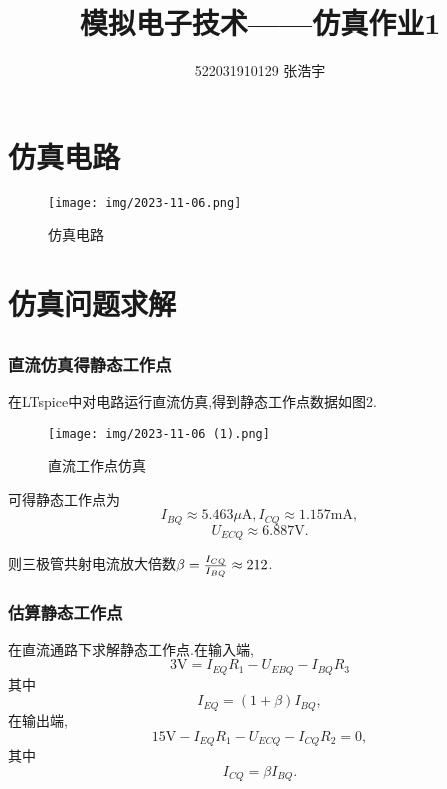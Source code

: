 \documentclass[12pt, a4paper, oneside]{ctexart}
\title{\textbf{模拟电子技术——仿真作业1}}
\author{522031910129 张浩宇}
\date{}
\begin{document}
    \maketitle

    \section{仿真电路}

        \begin{figure}[h]
            \centering
            \texttt{[image: img/2023-11-06.png]}
            \caption{仿真电路}
        \end{figure}

    \section{仿真问题求解}
        \subsection{}
        \subsubsection{直流仿真得静态工作点}
            在LTspice中对电路运行直流仿真,得到静态工作点数据如图2.

            \begin{figure}[h]
                \centering
                \texttt{[image: img/2023-11-06 (1).png]}
                \caption{直流工作点仿真}
            \end{figure}
            
            可得静态工作点为
            $$
            I_{BQ}\approx5.463\mu\text{A},I_{CQ}\approx1.157 \text{mA},
            $$
            $$
            U_{ECQ}\approx 6.887 \text{V}.
            $$

            则三极管共射电流放大倍数$\beta={ I_{CQ} \over I_{BQ}}\approx212 $.
        \subsubsection{估算静态工作点}
            在直流通路下求解静态工作点.在输入端,
            $$
            3\text{V}=I_{EQ}R_1-U_{EBQ}-I_{BQ}R_3
            $$
            其中
            $$
            I_{EQ}=(1+\beta)I_{BQ},
            $$
            在输出端,
            $$
            15\text{V}-I_{EQ}R_1-U_{ECQ}-I_{CQ}R_2=0,
            $$
            其中
            $$
            I_{CQ}=\beta I_{BQ}.
            $$
\end{document}

